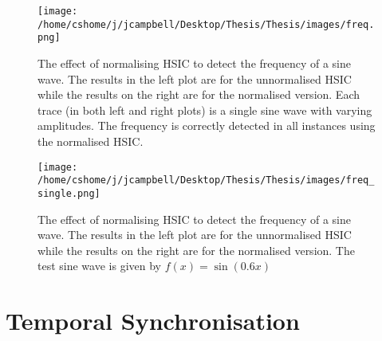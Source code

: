 \begin{figure}[h!]
\texttt{[image: /home/cshome/j/jcampbell/Desktop/Thesis/Thesis/images/freq.png]}
\caption{The effect of normalising HSIC to detect the frequency of a sine wave. The results in the left plot are for the unnormalised HSIC while the results on the right are for the normalised version. Each trace (in both left and right plots) is a single sine wave with varying amplitudes. The frequency is correctly detected in all instances using the normalised HSIC.  \label{freq}}
\end{figure}

\begin{figure}[h!]
\texttt{[image: /home/cshome/j/jcampbell/Desktop/Thesis/Thesis/images/freq\_single.png]}
\caption{The effect of normalising HSIC to detect the frequency of a sine wave. The results in the left plot are for the unnormalised HSIC while the results on the right are for the normalised version. The test sine wave is given by $f(x) = \sin(0.6 x)$ \label{freq_single}}
\end{figure}



\section{Temporal Synchronisation}

